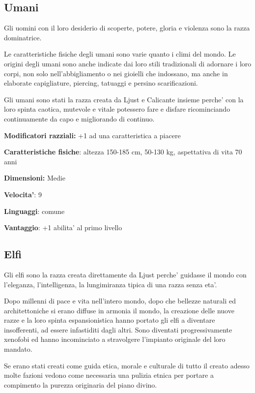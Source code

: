 \documentclass[a4paper,11pt,twoside,openany]{dndbook}
\begin{document}
\subsection{Umani}

Gli uomini con il loro desiderio di scoperte, potere, gloria e violenza sono la razza dominatrice.

Le caratteristiche fisiche degli umani sono varie quanto i climi del mondo. Le origini degli umani sono anche indicate dai loro stili tradizionali di adornare i loro corpi, non solo nell'abbigliamento o nei gioielli che indossano, ma anche in elaborate capigliature, piercing, tatuaggi e persino scarificazioni.

Gli umani sono stati la razza creata da Ljust e Calicante insieme perche' con la loro spinta caotica, mutevole e vitale potessero fare e disfare ricominciando continuamente da capo e migliorando di continuo.

\textbf{Modificatori razziali:} +1 ad una caratteristica a piacere

\textbf{Caratteristiche fisiche}: altezza 150-185 cm, 50-130 kg, aspettativa di vita 70 anni

\textbf{Dimensioni:} Medie

\textbf{Velocita'}: 9

\textbf{Linguaggi}: comune

\textbf{Vantaggio}: +1 abilita' al primo livello

\subsection{Elfi}

\label{elfi}

Gli elfi sono la razza creata direttamente da Ljust perche' guidasse il mondo con l'eleganza, l'intelligenza, la lungimiranza tipica di una razza senza eta'.

Dopo millenni di pace e vita nell'intero mondo, dopo che bellezze naturali ed architettoniche si erano diffuse in armonia il mondo, la creazione delle nuove razze e la loro spinta espansionistica hanno portato gli elfi a diventare insofferenti, ad essere infastiditi dagli altri. Sono diventati progressivamente xenofobi ed hanno incominciato a stravolgere l'impianto originale del loro mandato.

Se erano stati creati come guida etica, morale e culturale di tutto il creato adesso molte fazioni vedono come necessaria una pulizia etnica per portare a compimento la purezza originaria del piano divino. 
\end{document}
